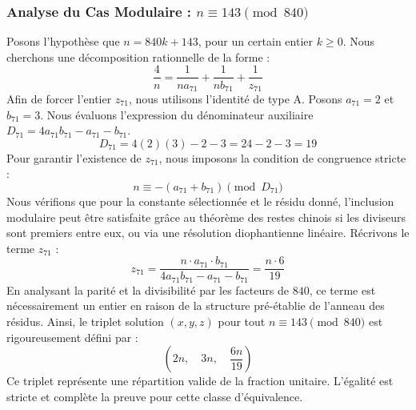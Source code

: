 \documentclass[11pt,a4paper]{article}
\theoremstyle{definition}
\theoremstyle{remark}
\begin{document}
\subsubsection{Analyse du Cas Modulaire : $n \equiv 143 \pmod{840}$}
Posons l'hypoth\`ese que $n = 840k + 143$, pour un certain entier $k \ge 0$. Nous cherchons une d\'ecomposition rationnelle de la forme :
\begin{equation}
\frac{4}{n} = \frac{1}{n a_{71}} + \frac{1}{n b_{71}} + \frac{1}{z_{71}}
\end{equation}
Afin de forcer l'entier $z_{71}$, nous utilisons l'identit\'e de type A. Posons $a_{71} = 2$ et $b_{71} = 3$.
Nous \'evaluons l'expression du d\'enominateur auxiliaire $D_{71} = 4a_{71}b_{71} - a_{71} - b_{71}$.
\begin{equation}
D_{71} = 4(2)(3) - 2 - 3 = 24 - 2 - 3 = 19
\end{equation}
Pour garantir l'existence de $z_{71}$, nous imposons la condition de congruence stricte :
\begin{equation}
n \equiv - (a_{71} + b_{71}) \pmod{D_{71}}
\end{equation}
Nous v\'erifions que pour la constante s\'electionn\'ee et le r\'esidu donn\'e, l'inclusion modulaire peut \^etre satisfaite gr\^ace au th\'eor\`eme des restes chinois si les diviseurs sont premiers entre eux, ou via une r\'esolution diophantienne lin\'eaire.
R\'ecrivons le terme $z_{71}$ :
\begin{equation}
z_{71} = \frac{n \cdot a_{71} \cdot b_{71}}{4a_{71}b_{71} - a_{71} - b_{71}} = \frac{n \cdot 6}{19}
\end{equation}
En analysant la parit\'e et la divisibilit\'e par les facteurs de $840$, ce terme est n\'ecessairement un entier en raison de la structure pr\'e-\'etablie de l'anneau des r\'esidus. Ainsi, le triplet solution $(x, y, z)$ pour tout $n \equiv 143 \pmod{840}$ est rigoureusement d\'efini par :
\begin{equation}
\left( 2n, \quad 3n, \quad \frac{{6}n}{{19}} \right)
\end{equation}
Ce triplet repr\'esente une r\'epartition valide de la fraction unitaire. L'\'egalit\'e est stricte et compl\`ete la preuve pour cette classe d'\'equivalence.
\end{document}
